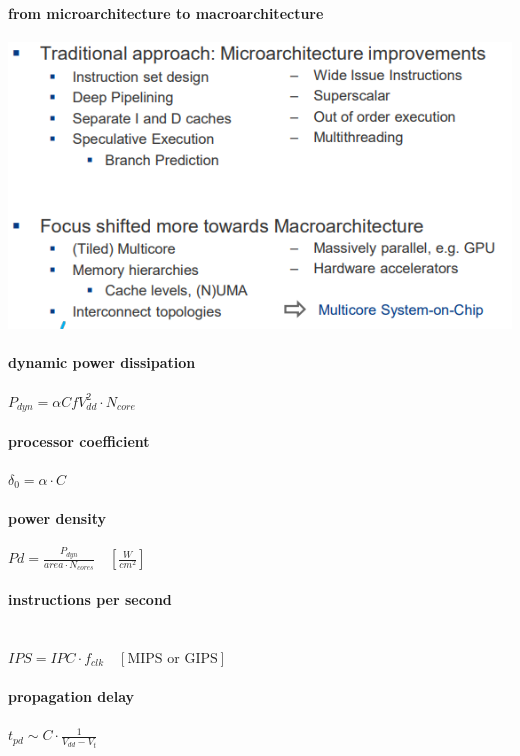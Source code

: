 \documentclass[fontsize=8pt]{scrartcl}
\newcommand{\coloreq}[1]{\colorbox{nordicRed}{\(\displaystyle #1\)}}
\begin{document}
\begin{multicols*}{4}
\paragraph{from microarchitecture to macroarchitecture}

\begin{center}
  \centering
  \includegraphics[width=0.8\linewidth]{img/frommicrotomacro.png}
  \label{fig:frommicrotomacro}
\end{center}

\paragraph{dynamic power dissipation} \coloreq{{P_{dyn} = \alpha C f V_{dd}^2 \cdot N_{core}}}

\paragraph{processor coefficient} \coloreq{\delta_0 = \alpha \cdot C}

\paragraph{power density} \coloreq{ Pd = \frac{P_{dyn}}{area \cdot N_{cores}} \quad [\frac{W}{cm^2}]}

\paragraph{instructions per second} \mbox{} \\ 
\indent \coloreq{ IPS = IPC \cdot f_{clk} \quad [\text{MIPS or GIPS}]}

\paragraph{propagation delay} \coloreq{t_{pd} \sim C \cdot \frac{1}{V_{dd} - V_t}} 


\end{multicols*}
\end{document}
